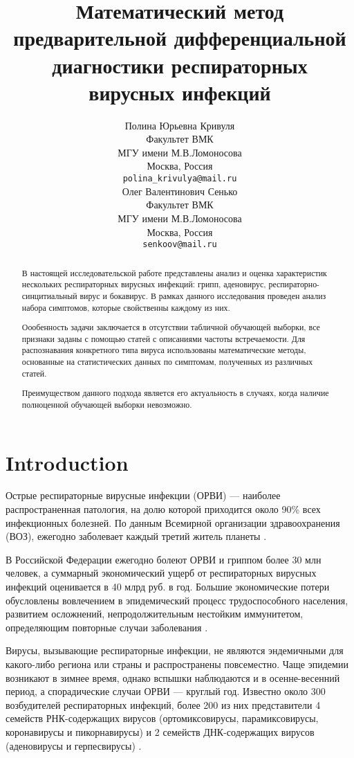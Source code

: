 \documentclass{article}
\title{Математический метод предварительной дифференциальной
диагностики респираторных вирусных инфекций}
\author{  Полина Юрьевна Кривуля \\
	Факультет ВМК \\
    МГУ имени М.В.Ломоносова \\
	Москва, Россия \\
	\texttt{polina\_krivulya@mail.ru} \\
	\And
	Олег Валентинович Сенько \\
	Факультет ВМК \\
    МГУ имени М.В.Ломоносова \\
	Москва, Россия \\
	\texttt{senkoov@mail.ru}  \\
}
\date{}
\begin{document}
\maketitle

\begin{abstract}

В настоящей исследовательской работе представлены анализ и оценка характеристик
нескольких респираторных вирусных инфекций: грипп, аденовирус, респираторно-синцитиальный вирус и бокавирус. В рамках данного исследования проведен анализ набора симптомов,
которые свойственны каждому из них. 

Оообенность задачи заключается в отсутствии табличной обучающей выборки, все признаки заданы с помощью статей с описаниями частоты встречаемости. Для распознавания конкретного типа вируса использованы математические методы, основанные на статистических данных по симптомам, полученных из различных статей.

Преимуществом данного подхода является его актуальность в случаях, когда наличие полноценной обучающей выборки невозможно.

\end{abstract}



\section{Introduction}
Острые респираторные вирусные инфекции (ОРВИ) — наиболее распространенная патология, на долю которой приходится около 90\% всех инфекционных болезней. По данным Всемирной организации здравоохранения (ВОЗ), ежегодно заболевает каждый третий житель планеты \cite{s1} \cite{s2} \cite{s3} \cite{s4}.

В Российской Федерации ежегодно болеют ОРВИ и гриппом более 30 млн человек, а суммарный экономический ущерб от респираторных вирусных инфекций оценивается в 40 млрд руб. в год. Большие экономические потери обусловлены вовлечением в эпидемический процесс трудоспособного населения, развитием осложнений, непродолжительным нестойким иммунитетом, определяющим повторные случаи заболевания \cite{s4} \cite{s5} \cite{s6} \cite{s7} \cite{s8}. 

Вирусы, вызывающие респираторные инфекции, не являются эндемичными для какого-либо региона или страны и распространены повсеместно. Чаще эпидемии возникают в зимнее время, однако вспышки наблюдаются и в осенне-весенний период, а спорадические случаи ОРВИ — круглый год. Известно около 300 возбудителей респираторных инфекций, более 200 из них представители 4 семейств РНК-содержащих вирусов (ортомиксовирусы, парамиксовирусы, коронавирусы и пикорнавирусы) и 2 семейств ДНК-содержащих вирусов (аденовирусы и герпесвирусы) \cite{s4} \cite{ss1}.
\end{document}
